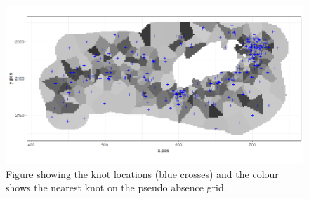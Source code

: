\begin{figure}[!htb]
\centering
\includegraphics[width=0.9\linewidth]{suppimages/knotdatablocks}
\caption{Figure showing the knot locations (blue crosses) and the colour shows the nearest knot on the pseudo absence grid.}
\label{fig:blocks}
\end{figure}


\newpage







